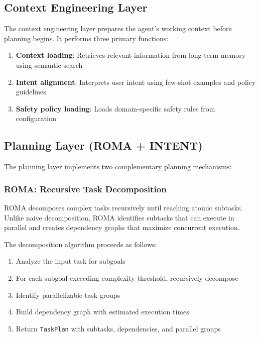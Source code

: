 \documentclass[12pt,a4paper]{article}
\begin{document}
\subsection{Context Engineering Layer}

The context engineering layer prepares the agent's working context before planning begins. It performs three primary functions:

\begin{enumerate}
    \item \textbf{Context loading}: Retrieves relevant information from long-term memory using semantic search
    \item \textbf{Intent alignment}: Interprets user intent using few-shot examples and policy guidelines
    \item \textbf{Safety policy loading}: Loads domain-specific safety rules from configuration
\end{enumerate}

\subsection{Planning Layer (ROMA + INTENT)}

The planning layer implements two complementary planning mechanisms:

\subsubsection{ROMA: Recursive Task Decomposition}

ROMA decomposes complex tasks recursively until reaching atomic subtasks. Unlike naive decomposition, ROMA identifies subtasks that can execute in parallel and creates dependency graphs that maximize concurrent execution.

The decomposition algorithm proceeds as follows:

\begin{enumerate}
    \item Analyze the input task for subgoals
    \item For each subgoal exceeding complexity threshold, recursively decompose
    \item Identify parallelizable task groups
    \item Build dependency graph with estimated execution times
    \item Return \texttt{TaskPlan} with subtasks, dependencies, and parallel groups
\end{enumerate}
\end{document}
